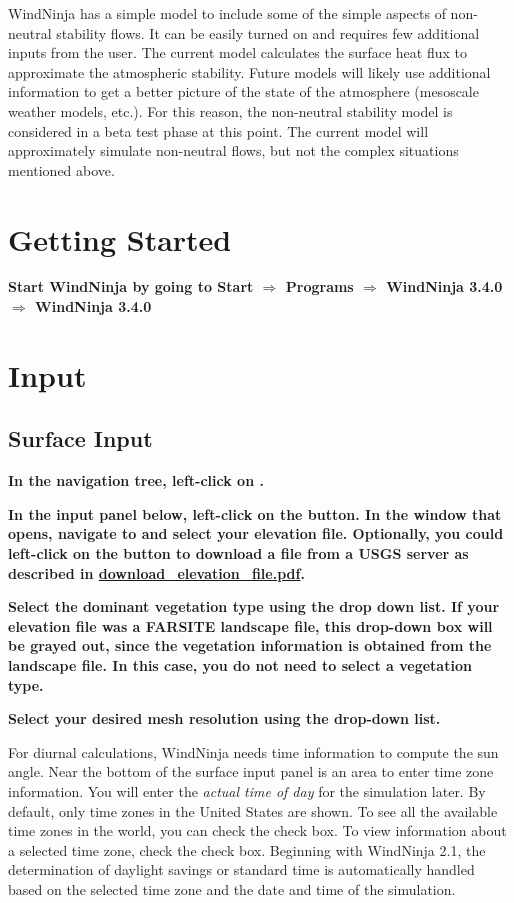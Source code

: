 \documentclass[12pt]{article}
\newcommand\vn{3.4.0}
\begin{document}
WindNinja has a simple model to include some of the simple aspects of non-neutral stability flows.  It can be easily turned on and requires few additional inputs from the user.  The current model calculates the surface heat flux to approximate the atmospheric stability.  Future models will likely use additional information to get a better picture of the state of the atmosphere (mesoscale weather models, etc.).  For this reason, the non-neutral stability model is considered in a beta test phase at this point.  The current model will approximately simulate non-neutral flows, but not the complex situations mentioned above.

\section{Getting Started}

\textbf{\color{red}Start WindNinja by going to Start $\Rightarrow$ Programs $\Rightarrow$ WindNinja \vn\ $\Rightarrow$ WindNinja \vn\ }

\section{Input}
\subsection{Surface Input}

\textbf{\color{red} In the navigation tree, left-click on .}


\textbf{\color{red} In the input panel below, left-click on the  button.  In the window that opens, navigate to and select your elevation file.  Optionally, you could left-click on the  button to download a file from a USGS server as described in \href{https://weather.firelab.org/windninja/tutorials/fetch_dem_instructions.pdf}{download\_elevation\_file.pdf}.}

\textbf{\color{red} Select the dominant vegetation type using the  drop down list.  If your elevation file was a FARSITE landscape file, this drop-down box will be grayed out, since the vegetation information is obtained from the landscape file.  In this case, you do not need to select a vegetation type.}

\textbf{\color{red}
Select your desired mesh resolution using the  drop-down list.}

For diurnal calculations, WindNinja needs time information to compute the sun angle.  Near the bottom of the surface input panel is an area to enter time zone information.  You will enter the \textit{actual time of day} for the simulation later.  By default, only time zones in the United States are shown.  To see all the available time zones in the world, you can check the  check box.  To view information about a selected time zone, check the  check box.  Beginning with WindNinja 2.1, the determination of daylight savings or standard time is automatically handled based on the selected time zone and the date and time of the simulation.
\end{document}
